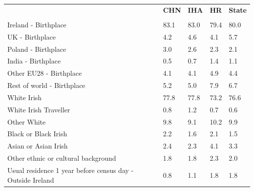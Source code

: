 \documentclass{article}
\begin{document}
\pagebreak
\begin{table}[h]	
\centering
		\begin{tabular}{KTTTT}
  \hline
& \textbf{CHN} & \textbf{IHA} & \textbf{HR}& \textbf{State}\\ 
  \hline
    \\ 
    \hline
Ireland - Birthplace & 83.1& 83.0& 79.4& 80.0\\
UK - Birthplace & 4.2& 4.6& 4.1& 5.7\\
Poland - Birthplace & 3.0& 2.6& 2.3& 2.1\\
India - Birthplace & 0.5& 0.7& 1.4& 1.1\\
Other EU28 - Birthplace & 4.1& 4.1& 4.9& 4.4\\
Rest of world - Birthplace & 5.2& 5.0& 7.9& 6.7\\
    \hline
White Irish & 77.8& 77.8& 73.2& 76.6\\
White Irish Traveller & 0.8& 1.2& 0.7& 0.6\\
Other White &  9.8&  9.1& 10.2&  9.9\\
Black or Black Irish & 2.2& 1.6& 2.1& 1.5\\
Asian or Asian Irish & 2.4& 2.3& 4.1& 3.3\\
Other ethnic or cultural background & 1.8& 1.8& 2.3& 2.0\\
    \hline
Usual residence 1 year before census day - Outside Ireland & 0.8& 1.1& 1.8& 1.8\\


\end{tabular}
\end{table}
\end{document}
